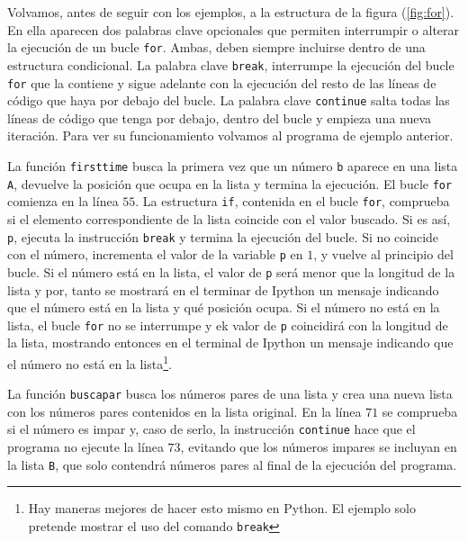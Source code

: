 \begin{paracol}{2}
Volvamos, antes de seguir con los ejemplos, a la estructura de la figura (\ref{fig:for}). En ella aparecen dos palabras clave opcionales que permiten interrumpir o alterar la ejecución de un bucle \texttt{for}. Ambas, deben siempre incluirse dentro de una estructura condicional. La palabra clave \texttt{break}, interrumpe la ejecución del bucle \texttt{for} que la contiene y sigue adelante con la ejecución del resto de las líneas de código que haya por debajo del bucle. La palabra clave \texttt{continue} salta todas las líneas de código que tenga por debajo, dentro del bucle y empieza una nueva iteración. Para ver su funcionamiento volvamos al programa de ejemplo anterior.

La función \texttt{firsttime} busca la primera vez que un número \texttt{b} aparece en una lista \texttt{A}, devuelve la posición que ocupa en la lista y termina la ejecución. El bucle \texttt{for} comienza en la línea $55$. La estructura \texttt{if}, contenida en el bucle \texttt{for}, comprueba si el elemento correspondiente de la lista coincide con el valor buscado. Si es así, \texttt{p}, ejecuta la instrucción \texttt{break} y termina la ejecución del bucle. Si no coincide con el número, incrementa el valor de la variable \texttt{p} en $1$, y vuelve al principio del bucle. Si el número está en la lista, el valor de \texttt{p} será menor que la longitud de la lista y por, tanto se mostrará en el terminar de Ipython un mensaje indicando que el número está en la lista y qué posición ocupa. Si el número no está en la lista, el bucle \texttt{for} no se interrumpe y ek valor de \texttt{p} coincidirá con la longitud de la lista, mostrando entonces en el terminal de Ipython un mensaje indicando que el número no está en la lista\footnote{Hay maneras mejores de hacer esto mismo en Python. El ejemplo solo pretende mostrar el uso del comando \texttt{break}}.

La función \texttt{buscapar} busca los números pares de una lista y crea una nueva lista con los números pares contenidos en la lista original. En la línea $71$ se comprueba si el número es impar y, caso de serlo, la instrucción \texttt{continue} hace que el programa no ejecute la línea $73$, evitando que los números impares se incluyan en la lista \texttt{B}, que solo contendrá números pares al final de la ejecución del programa.


\end{paracol}
